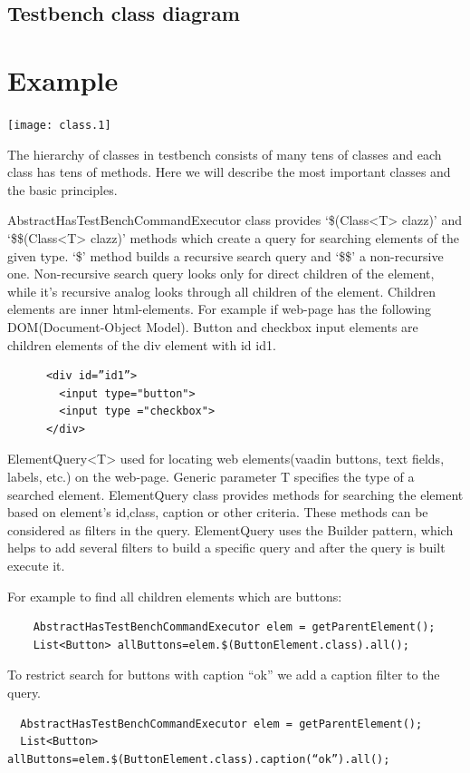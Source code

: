 \documentclass{article}
\begin{document}
  \subsection{Testbench class diagram}
  
  \section{Example}
  \texttt{[image: class.1]}
  
  The hierarchy of classes in testbench consists of many tens of classes and each class has tens of methods.
  Here we will describe the most important classes and the basic principles.

AbstractHasTestBenchCommandExecutor class provides  `\$(Class<T> clazz)' and
`\$\$(Class<T> clazz)' methods which create a query for searching elements of
the given type.
 `\$' method builds a recursive search query and `\$\$' a non-recursive one.
 Non-recursive search query looks only for direct children of the element, while it’s recursive analog looks
  through all children of the element. Children elements are inner html-elements.
   For example if web-page has the following DOM(Document-Object Model). 
   Button and checkbox input elements are children elements of the div element with id id1.
  \lstset{language=HTML}
    \begin{lstlisting}
      <div id=”id1”>
        <input type="button">
        <input type ="checkbox">
      </div>
  \end{lstlisting}
  
ElementQuery<T> used for locating web elements(vaadin buttons, text fields, labels, etc.) on the web-page.
 Generic parameter T specifies the type of a searched element. 
 ElementQuery class provides methods for searching the element based on element’s id,class,
  caption or other criteria. These methods can be considered as filters in the query.
   ElementQuery uses the Builder pattern, which helps to add several filters to build a specific query and after
    the query is built execute it.

For example to find all children elements which are buttons:
  \lstset{language=Java}
    \begin{lstlisting}
    AbstractHasTestBenchCommandExecutor elem = getParentElement();
    List<Button> allButtons=elem.$(ButtonElement.class).all();
  \end{lstlisting}
  
To restrict search for buttons with caption “ok” we add a caption filter to the query.
  \lstset{language=Java}
  \begin{lstlisting}
  AbstractHasTestBenchCommandExecutor elem = getParentElement();
  List<Button> allButtons=elem.$(ButtonElement.class).caption(“ok”).all();
  \end{lstlisting}
  
\end{document}
